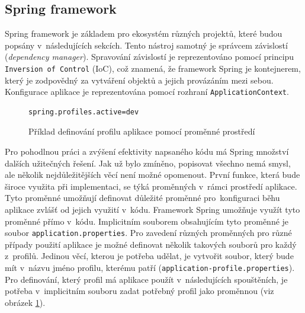     \subsection{Spring framework}
        Spring framework je základem pro ekosystém různých projektů, které budou popsány v~následujících sekcích.\cite{spring-framework} Tento nástroj samotný je správcem závislostí (\textit{dependency manager}). Spravování závislostí je reprezentováno pomocí principu \texttt{Inversion of Control} (IoC), což znamená, že framework Spring je kontejnerem, který je zodpovědný za vytváření objektů a jejich provázáním mezi sebou. Konfigurace aplikace je reprezentována pomocí rozhraní \texttt{ApplicationContext}.
        
        \begin{figure}
            \begin{verbatim}
spring.profiles.active=dev
            \end{verbatim}
            \caption{Příklad definování profilu aplikace pomocí proměnné prostředí} 
            \label{code:current-spring-profile}
        \end{figure}
        Pro pohodlnou práci a zvýšení efektivity napsaného kódu má Spring množství dalších užitečných řešení. Jak už bylo zmíněno, popisovat všechno nemá smysl, ale několik nejdůležitějších věcí není možné opomenout. První funkce, která bude široce využita při implementaci, se týká proměnných v~rámci prostředí aplikace. Tyto proměnné umožňují definovat důležité proměnné pro~konfiguraci běhu aplikace zvlášť od jejich využití v~kódu. Framework Spring umožňuje využít tyto proměnné přímo v~kódu. Implicitním souborem obsahujícím tyto proměnné je soubor \texttt{application.properties}. Pro zavedení různých proměnných pro různé případy použití aplikace je možné definovat několik takových souborů pro každý z~profilů. Jedinou věcí, kterou je potřeba udělat, je vytvořit soubor, který bude mít v~názvu jméno profilu, kterému patří (\texttt{application-{profile}.properties}). Pro definování, který profil má aplikace použít v~následujících spouštěních, je potřeba v~implicitním souboru zadat potřebný profil jako proměnnou (viz obrázek \ref{code:current-spring-profile}). 
        
